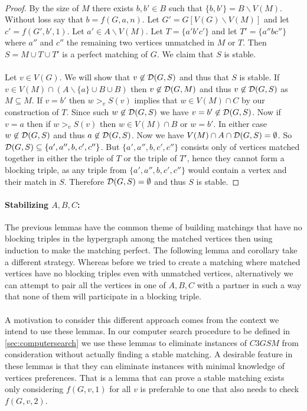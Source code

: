 \paragraph{}
\begin{proof}
By the size of $M$ there exists $b,b' \in B$ such that $\{b,b'\} = B \backslash V(M)$. Without loss say that $b = f(G, a, n)$. Let $G' = G[V(G)\backslash V(M)]$ and let $c' = f(G',b', 1)$. Let $a' \in A\backslash V(M)$. Let $T = \{a'b'c'\}$ and let $T' = \{a''bc''\}$ where $a''$ and $c''$ the remaining two vertices unmatched in $M$ or $T$. Then $S = M \cup T \cup T'$ is a perfect matching of $G$. We claim that $S$ is stable.
\paragraph{}
Let $v \in V(G)$. We will show that $v \not\in \mathcal{D}(G,S)$ and thus that $S$ is stable. If $v \in V(M) \cap (A\backslash \{a\} \cup B \cup B)$ then $v \not\in \mathcal{D}(G,M)$ and thus $v \not \in \mathcal{D}(G,S)$ as $M \subseteq M$. If $v = b'$ then $w >_v S(v)$ implies that $w \in V(M) \cap C$ by our construction of $T$. Since such $w \not\in \mathcal{D}(G,S)$ we have $v=b' \not\in \mathcal{D}(G,S)$. Now if $v = a$ then if $w>_v S(v)$ then $w \in V(M) \cap B$ or $w = b'$. In either case $w \not\in \mathcal{D}(G,S)$ and thus $a \not \in \mathcal{D}(G,S)$. Now we have $V(M) \cap A \cap \mathcal{D}(G,S) = \emptyset$. So $\mathcal{D}(G,S) \subseteq \{a',a'',b, c',c''\}$. But $\{a',a'',b, c',c''\}$ consists only of vertices matched together in either the triple of $T$ or the triple of $T'$, hence they cannot form a blocking triple, as any triple from $\{a',a'',b, c',c''\}$ would contain a vertex and their match in $S$. Therefore $\mathcal{D}(G,S) = \emptyset$ and thus $S$ is stable.
\end{proof}

\paragraph{Stabilizing $A,B,C$:}
The previous lemmas have the common theme of building matchings that have no blocking triples in the hypergraph among the matched vertices then using induction to make the matching perfect. The following lemma and corollary take a different strategy. Whereas before we tried to create a matching where matched vertices have no blocking triples even with unmatched vertices, alternatively we can attempt to pair all the vertices in one of $A,B,C$ with a partner in such a way that none of them will participate in a blocking triple.
\paragraph{}
A motivation to consider this different approach comes from the context we intend to use these lemmas. In our computer search procedure to be defined in \ref{sec:computersearch} we use these lemmas to eliminate instances of $C3GSM$ from consideration without actually finding a stable matching. A desirable feature in these lemmas is that they can eliminate instances with minimal knowledge of vertices preferences. That is a lemma that can prove a stable matching exists only considering $f(G,v,1)$ for all $v$ is preferable to one that also needs to check $f(G,v,2)$.
